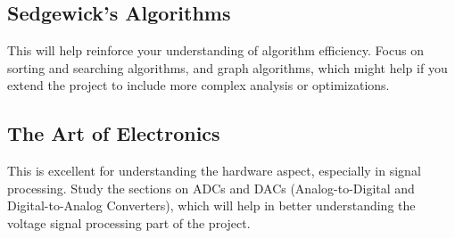 \documentclass{article}
\begin{document}
\subsection{Sedgewick's Algorithms}

This will help reinforce your understanding of algorithm efficiency. Focus on sorting and searching algorithms, and graph algorithms, which might help if you extend the project to include more complex analysis or optimizations.

\subsection{The Art of Electronics}

This is excellent for understanding the hardware aspect, especially in signal processing. Study the sections on ADCs and DACs (Analog-to-Digital and Digital-to-Analog Converters), which will help in better understanding the voltage signal processing part of the project.
\end{document}
